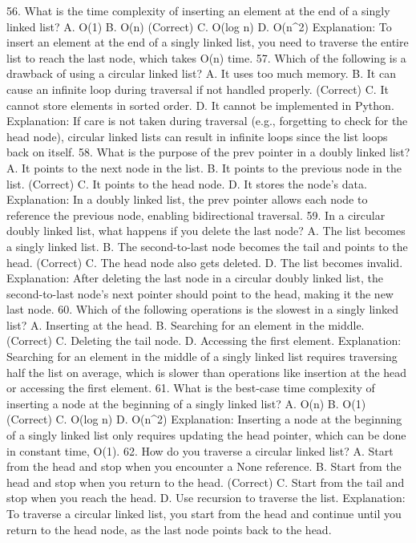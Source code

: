 56. What is the time complexity of inserting an element at the end of a singly linked list?
A. O(1)
B. O(n) (Correct)
C. O(log n)
D. O(n^2)
Explanation: To insert an element at the end of a singly linked list, you need to traverse the entire list to reach the last node, which takes O(n) time.
57. Which of the following is a drawback of using a circular linked list?
A. It uses too much memory.
B. It can cause an infinite loop during traversal if not handled properly. (Correct)
C. It cannot store elements in sorted order.
D. It cannot be implemented in Python.
Explanation: If care is not taken during traversal (e.g., forgetting to check for the head node), circular linked lists can result in infinite loops since the list loops back on itself.
58. What is the purpose of the prev pointer in a doubly linked list?
A. It points to the next node in the list.
B. It points to the previous node in the list. (Correct)
C. It points to the head node.
D. It stores the node’s data.
Explanation: In a doubly linked list, the prev pointer allows each node to reference the previous node, enabling bidirectional traversal.
59. In a circular doubly linked list, what happens if you delete the last node?
A. The list becomes a singly linked list.
B. The second-to-last node becomes the tail and points to the head. (Correct)
C. The head node also gets deleted.
D. The list becomes invalid.
Explanation: After deleting the last node in a circular doubly linked list, the second-to-last node’s next pointer should point to the head, making it the new last node.
60. Which of the following operations is the slowest in a singly linked list?
A. Inserting at the head.
B. Searching for an element in the middle. (Correct)
C. Deleting the tail node.
D. Accessing the first element.
Explanation: Searching for an element in the middle of a singly linked list requires traversing half the list on average, which is slower than operations like insertion at the head or accessing the first element.
61. What is the best-case time complexity of inserting a node at the beginning of a singly linked list?
A. O(n)
B. O(1) (Correct)
C. O(log n)
D. O(n^2)
Explanation: Inserting a node at the beginning of a singly linked list only requires updating the head pointer, which can be done in constant time, O(1).
62. How do you traverse a circular linked list?
A. Start from the head and stop when you encounter a None reference.
B. Start from the head and stop when you return to the head. (Correct)
C. Start from the tail and stop when you reach the head.
D. Use recursion to traverse the list.
Explanation: To traverse a circular linked list, you start from the head and continue until you return to the head node, as the last node points back to the head.
